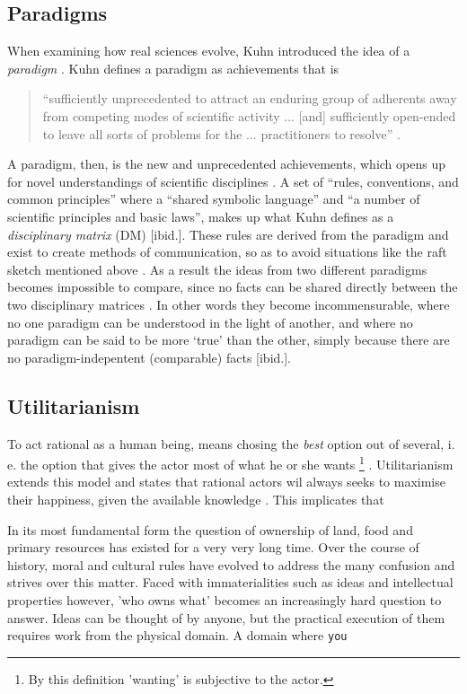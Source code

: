 \documentclass{article}
\begin{document}
\subsection{Paradigms} \label{Theory:Paradigms}
When examining how real sciences evolve, Kuhn introduced the idea of a \textit{paradigm} \citep[p. 59]{Holm:2014}. Kuhn defines a paradigm as achievements that is
\begin{quote}
``sufficiently unprecedented to attract an enduring group of adherents away from competing modes of scientific activity ... [and] sufficiently open-ended to leave all sorts of problems for the ... practitioners to resolve'' \citep[p. 10-11]{Kuhn:2012}.
\end{quote}
A paradigm, then, is the new and unprecedented achievements, which opens up for novel understandings of scientific disciplines \citep[p. 61]{Holm:2014}. A set of ``rules, conventions, and common principles'' where a ``shared symbolic language'' and ``a number of scientific principles and basic laws'', makes up what Kuhn defines as a \textit{disciplinary matrix} (DM) [ibid.]. These rules are derived from the paradigm and exist to create methods of communication, so as to avoid situations like the raft sketch mentioned above \citep[p. 181]{Kuhn:2012}. As a result the ideas from two different paradigms becomes impossible to compare, since no facts can be shared directly between the two disciplinary matrices \citep[p. 66]{Holm:2014}. In other words they become incommensurable, where no one paradigm can be understood in the light of another, and where no paradigm can be said to be more `true' than the other, simply because there are no paradigm-indepentent (comparable) facts [ibid.].

\subsection{Utilitarianism}
To act rational as a human being, means chosing the \textit{best} option out of several, i. e. the option that gives the actor most of what he or she wants \footnote{By this definition 'wanting' is subjective to the actor.} \citep[p. 232]{Gilje:2007}. Utilitarianism extends this model and states that rational actors wil always seeks to maximise their happiness, given the available knowledge \citep[p. 232]{Holm:2014, Gilje:2007}. This implicates that 

In its most fundamental form the question of ownership of land, food and primary resources has existed for a very very long time. Over the course of history, moral and cultural rules have evolved to address the
many confusion and strives over this matter. Faced with immaterialities such as
ideas and intellectual properties however, 'who owns what' becomes an increasingly hard question to answer. Ideas can be thought of by anyone, but the practical execution of them requires work from the physical domain. A domain where \texttt{you}
\end{document}
